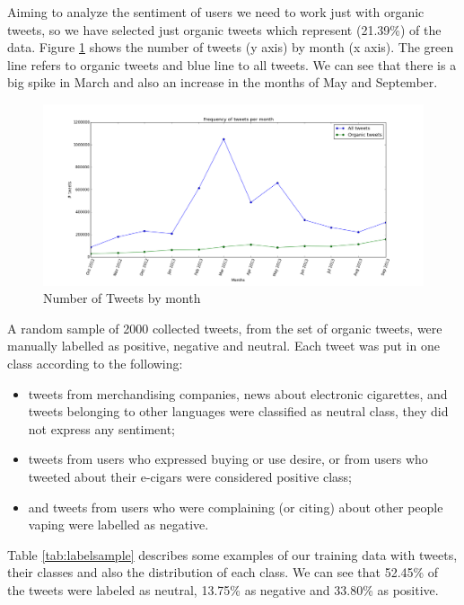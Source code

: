 \documentclass{sig-alternate}
\begin{document}
Aiming to analyze the sentiment of users we need to work just with organic tweets, so we have selected just organic tweets which represent (21.39\%) of the data. Figure \ref{figura:total} shows the number of tweets (y axis) by month (x axis). The green line refers to organic tweets and blue line to all tweets. We can see that there is a big spike in March and also an increase in the months of May and September.

\begin{figure}[t]
\includegraphics[width=\columnwidth]{111.png}
\caption{Number of Tweets by month}
\centering
\label{figura:total}
\end{figure}

A random sample of 2000 collected tweets, from the set of organic tweets, were manually labelled as positive, negative and neutral. Each tweet was put in one class according to the following:
\begin{itemize}
\item  tweets from merchandising companies, news about electronic cigarettes, and tweets belonging to other languages were classified as neutral class, they did not express any sentiment; 
\item  tweets from users who expressed buying or use desire, or from users who tweeted about their e-cigars were considered positive class; 
\item  and tweets from users who were complaining (or citing) about other people vaping were labelled as negative. 
\end{itemize}

Table \ref{tab:labelsample} describes some examples of our training data with tweets, their classes and also the distribution of each class. We can see that 52.45\% of the tweets were labeled as neutral, 13.75\% as negative and 33.80\% as positive. 
\end{document}
